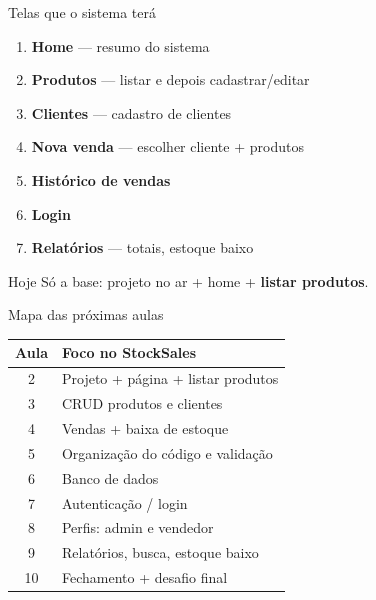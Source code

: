 \documentclass[aspectratio=169,11pt]{beamer}
\begin{document}
\begin{frame}{Telas que o sistema terá}
  \begin{enumerate}
    \item \textbf{Home} --- resumo do sistema
    \item \textbf{Produtos} --- listar e depois cadastrar/editar
    \item \textbf{Clientes} --- cadastro de clientes
    \item \textbf{Nova venda} --- escolher cliente + produtos
    \item \textbf{Histórico de vendas}
    \item \textbf{Login}
    \item \textbf{Relatórios} --- totais, estoque baixo
  \end{enumerate}

  \vspace{0.5em}
  \begin{block}{Hoje}
    Só a base: projeto no ar + home + \textbf{listar produtos}.
  \end{block}
\end{frame}

\begin{frame}{Mapa das próximas aulas}
  \begin{center}
  \begin{tabular}{cl}
    \toprule
    Aula & Foco no StockSales \\
    \midrule
    2 & Projeto + página + listar produtos \\
    3 & CRUD produtos e clientes \\
    4 & Vendas + baixa de estoque \\
    5 & Organização do código e validação \\
    6 & Banco de dados \\
    7 & Autenticação / login \\
    8 & Perfis: admin e vendedor \\
    9 & Relatórios, busca, estoque baixo \\
    10 & Fechamento + desafio final \\
    \bottomrule
  \end{tabular}
  \end{center}
\end{frame}
\end{document}
